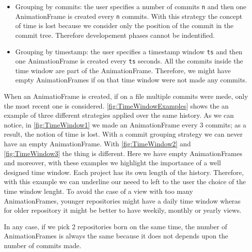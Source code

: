 \begin{itemize}
    \item{Grouping by commits}: the user specifies a number of commits \texttt{n} and then one AnimationFrame is created every \texttt{n} commits. With this strategy the concept of time is lost because we consider only the position of the commit in the commit tree. Therefore developement phases cannot be indentified. 
    \item{Grouping by timestamp}: the user specifies a timestamp window \texttt{ts} and then one AnimationFrame is created every \texttt{ts} seconds. All the commits inside the time window are part of the AnimationFrame. Therefore, we might have empty AnimationFrames if on that time window were not made any commits. 
\end{itemize}

When an AnimatioFrame is created, if on a file multiple commits were mede, only the most recent one is considered. 
\autoref{fig:TimeWindowExamples} shows the an example of three different strategies applied over the same history. As we can notice, in \autoref{fig:TimeWindow1} we made an AnimationFrame every 3 commits; as a result, the notion of time is lost. With a commit grouping strategy we can never have an empty AnimationFrame. With  \autoref{fig:TimeWindow2} and \autoref{fig:TimeWindow3} the thing is different. Here we have empty AnimationFrames and moreover, with these examples we highlight the importance of a well designed time window. Each project has its own length of the history. Therefore, with this example we can underline our neeed to left to the user the choice of the time window lenght. To avoid the case of a view with too many AnimationFrames, younger repositories might have a daily time window wheras for older repository it might be better to have weekily, monthly or yearly views. 

In any case, if we pick 2 repositories born on the same time, the number of AnimationFrames is always the same because it does not depends upon the number of commits made. 


